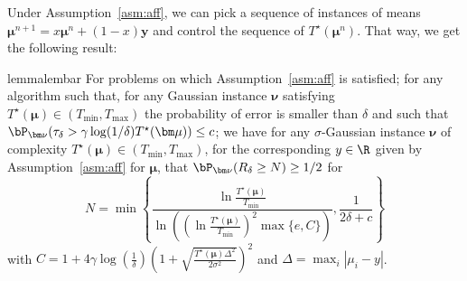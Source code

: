 Under Assumption~\ref{asm:aff}, we can pick a sequence of instances of means $\bm\mu^{n+1}=x\bm\mu^n+(1-x)\bm y$ and control the sequence of $T^\star(\bm\mu^n)$. That way, we get the following result:
\begin{restatable}{lemma}{lembar}\label{lem:bar}
	For problems on which Assumption~\ref{asm:aff} is satisfied;
	for any algorithm such that, for any Gaussian instance $\bm\nu$ satisfying $T^\star(\bm\mu)\in (T_{\min},T_{\max})$ the probability of error is smaller than $\delta$ and such that $\bP_{\bm\nu}(\tau_\delta>\gamma\log(1/\delta) T^\star(\bm\mu))\leq c$; we have for any $\sigma$-Gaussian instance $\bm\nu$ of complexity $T^\star(\bm\mu)\in (T_{\min},T_{\max})$, for the corresponding $y\in \R$ given by Assumption~\ref{asm:aff} for $\bm\mu$, that $\bP_{\bm\nu} (R_\delta\geq N)\geq 1/2$ for \[N = \min\left\{\frac{\ln \frac{T^\star(\bm\mu)}{T_{\min}}}{\ln\left( \left(\ln \frac{T^\star(\bm\mu)}{T_{\min}}\right)^2 \max\{e,C\} \right)},\frac{1}{2\delta+c}\right\}\] with $C=1+4\gamma\log(\frac{1}{\delta})\left(1+\sqrt{\frac{T^\star(\bm\mu)\Delta^2}{2\sigma^2}}\right)^2$ and $\Delta = \max_i |\mu_i -y|$.
\end{restatable}

